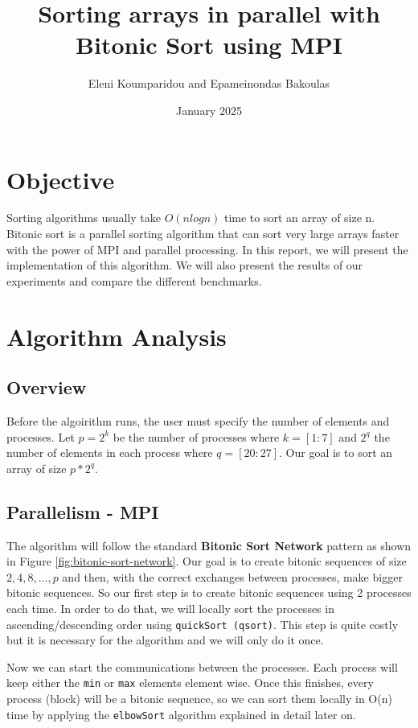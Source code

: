 \documentclass{article}
\title{Sorting arrays in parallel with Bitonic Sort using MPI}
\author{Eleni Koumparidou and Epameinondas Bakoulas}
\date{January 2025}
\begin{document}
\maketitle

\section{Objective}
Sorting algorithms usually take $O(nlogn)$ time to sort an array of size n. Bitonic sort is a parallel sorting 
algorithm that can sort very large arrays faster with the power of MPI and parallel processing. In this report, 
we will present the implementation of this algorithm. We will also present the results of our experiments 
and compare the different benchmarks.

\section{Algorithm Analysis}

\subsection{Overview}

Before the algoirithm runs, the user must specify the number of elements and processes.
Let $p = 2^k$ be the number of processes where $k = [1:7]$ and $2^q$ the number of elements in each process
where $q = [20:27]$. Our goal is to sort an array of size $p * 2^q$.

\subsection{Parallelism - MPI}

The algorithm will follow the standard \textbf{Bitonic Sort Network} pattern as shown in Figure \ref{fig:bitonic-sort-network}.
Our goal is to create bitonic sequences of size $2, 4, 8, ..., p$ and then, with the correct exchanges between
processes, make bigger bitonic sequences. So our first step is to create bitonic sequences using 2 processes each time.
In order to do that, we will locally sort the processes in ascending/descending order using \texttt{quickSort (qsort)}.
This step is quite costly but it is necessary for the algorithm and we will only do it once.

Now we can start the communications between the processes. Each process will keep either the \texttt{min} or
\texttt{max} elements element wise. Once this finishes, every process (block) will be a bitonic sequence, so we can sort 
them locally in O(n) time by applying the \texttt{elbowSort} algorithm explained in detail later on.
\end{document}
